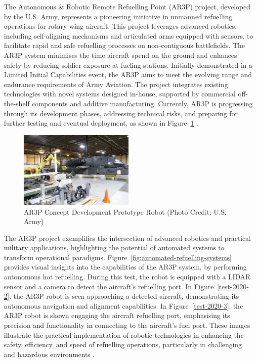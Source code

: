 \documentclass[12pt,oneside]{book} %
\begin{document}
The Autonomous \& Robotic Remote Refuelling Point (AR3P) project, developed by
the U.S. Army, represents a pioneering initiative in unmanned refuelling
operations for rotary-wing aircraft. This project leverages advanced robotics,
including self-aligning mechanisms and articulated arms equipped with sensors,
to facilitate rapid and safe refuelling processes on non-contiguous
battlefields. The AR3P system minimises the time aircraft spend on the ground
and enhances safety by reducing soldier exposure at fueling stations. Initially
demonstrated in a Limited Initial Capabilities event, the AR3P aims to meet the
evolving range and endurance requirements of Army Aviation. The project
integrates existing technologies with novel systems designed in-house,
supported by commercial off-the-shelf components and additive manufacturing.
Currently, AR3P is progressing through its development phases, addressing
technical risks, and preparing for further testing and eventual deployment, as
shown in Figure~\ref{fig:test-2017} \cite{Ficken2017}.

\begin{figure}[H]
    \centering
    \includegraphics[width=0.5\textwidth]{figures/test_2017.jpg}
    \caption{AR3P Concept Development Prototype Robot (Photo Credit: U.S. Army)}\label{fig:test-2017}
\end{figure}

The AR3P project exemplifies the intersection of advanced robotics and
practical military applications, highlighting the potential of automated
systems to transform operational paradigms.
Figure~\ref{fig:automated-refuelling-systems} provides visual insights into the
capabilities of the AR3P system, by performing autonomous hot refuelling.
During this test, the robot is equipped with a LIDAR sensor and a camera to
detect the aircraft's refuelling port. In Figure~\ref{test-2020-2}, the AR3P
robot is seen approaching a detected aircraft, demonstrating its autonomous
navigation and alignment capabilities. In Figure~\ref{test-2020-3}, the AR3P
robot is shown engaging the aircraft refuelling port, emphasising its precision
and functionality in connecting to the aircraft’s fuel port. These images
illustrate the practical implementation of robotic technologies in enhancing
the safety, efficiency, and speed of refuelling operations, particularly in
challenging and hazardous environments \cite{AR3P2020}.
\end{document}
